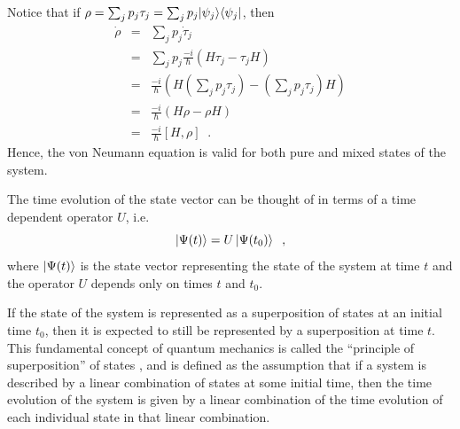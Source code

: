Notice that if $\rho = \sum_j p_j \tau_j = \sum_j p_j |\psi_j\rangle\langle\psi_j|$, then
\begin{eqnarray*}
\dot{\rho} &=& \sum_j p_j \dot{\tau}_j\\
&=& \sum_j p_j \frac{-i}{\hbar}\left(H\tau_j-\tau_j H\right)\\
&=& \frac{-i}{\hbar}\left(H\left(\sum_j p_j \tau_j\right)-\left(\sum_j p_j \tau_j\right)H\right)\\
&=& \frac{-i}{\hbar}\left(H\rho-\rho H\right)\\
&=& \frac{-i}{\hbar} [H,\rho]\;\;.
\end{eqnarray*}
Hence, the von Neumann equation is valid for both pure and mixed states of the system.

The time evolution of the state vector can be thought of in terms of a time dependent operator $U$, i.e.\
$$
\left|\Psi(t)\right\rangle = U\left|\Psi(t_0)\right\rangle\;\;,
$$
where $\left|\Psi(t)\right\rangle$ is the state vector representing the state of the system at time $t$ and the operator $U$ depends only on times $t$ and $t_0$.  

If the state of the system is represented as a superposition of states at an initial time $t_0$, then it is expected to still be represented by a superposition at time $t$.  This fundamental concept of quantum mechanics is called the ``principle of superposition'' of states \cite{Landau1977, Messiah1999}, and is defined as the assumption that if a system is described by a linear combination of states at some initial time, then the time evolution of the system is given by a linear combination of the time evolution of each individual state in that linear combination\cite{Landau1977}. 

